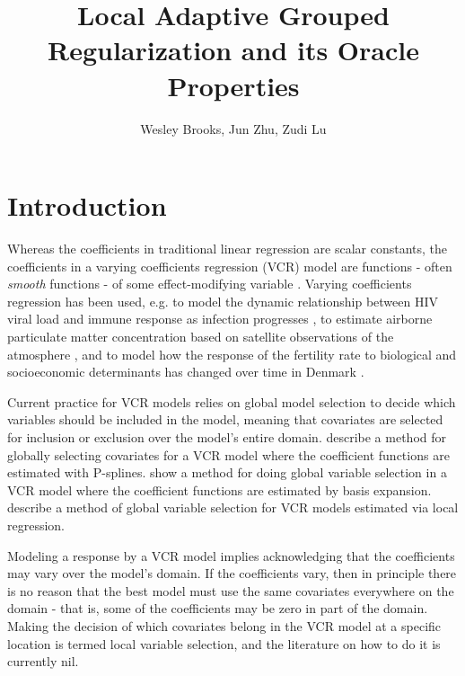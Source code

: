 \documentclass[12pt,english,authoryear, review]{article}\usepackage[]{graphicx}\usepackage[]{color}
\theoremstyle{plain}
\theoremstyle{plain}
\begin{document}
\title{Local Adaptive Grouped Regularization and its Oracle Properties}


\author{Wesley Brooks, Jun Zhu, Zudi Lu}

\maketitle

\section{Introduction}

Whereas the coefficients in traditional linear regression are scalar
constants, the coefficients in a varying coefficients regression (VCR)
model are functions - often \emph{smooth} functions - of some effect-modifying
variable \citep{Cleveland-Grosse-1991,Hastie-Tibshirani-1993}. Varying
coefficients regression has been used, e.g. to model the dynamic relationship
between HIV viral load and immune response as infection progresses
\citep{Liang-Wu-Carroll-2003}, to estimate airborne particulate matter
concentration based on satellite observations of the atmosphere \citep{Pelletier-Santer-Vidot-2007},
and to model how the response of the fertility rate to biological
and socioeconomic determinants has changed over time in Denmark \citep{Kohler-Rodgers-Christensen-2003}.

Current practice for VCR models relies on global model selection to
decide which variables should be included in the model, meaning that
covariates are selected for inclusion or exclusion over the model's
entire domain. \citet{Antoniadis:2012a} describe a method for globally
selecting covariates for a VCR model where the coefficient functions
are estimated with P-splines. \citet{Wang-2008a} show a method for
doing global variable selection in a VCR model where the coefficient
functions are estimated by basis expansion. \citet{Wang-Xia-2009}
describe a method of global variable selection for VCR models estimated
via local regression.

Modeling a response by a VCR model implies acknowledging that the
coefficients may vary over the model's domain. If the coefficients
vary, then in principle there is no reason that the best model must
use the same covariates everywhere on the domain - that is, some of
the coefficients may be zero in part of the domain. Making the decision
of which covariates belong in the VCR model at a specific location
is termed local variable selection, and the literature on how to do
it is currently nil.
\end{document}
